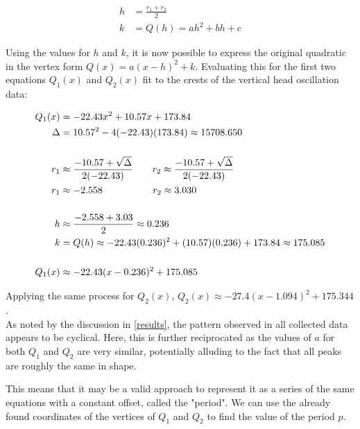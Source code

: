 \documentclass[12pt, a4paper]{article}
\begin{document}
\begin{align*}
    h & = \frac{r_1 + r_2}{2}  \\
    k & = Q(h) = ah^2 + bh + c
\end{align*}

Using the values for $h$ and $k$, it is now possible to express the original
quadratic in the vertex form $Q(x)=a(x-h)^2+k$. Evaluating this for the first
two equations $Q_1(x)$ and $Q_2(x)$ fit to the crests of the vertical head
oscillation data:

\begin{align*}
    Q_1(x) & = -22.43x^2 + 10.57x + 173.84                                                                                                          \\
    \Delta & = 10.57^2 - 4(-22.43)(173.84) \approx 15708.650                                                                                        \\[5mm]
    r_1    & \approx \frac{-10.57 + \sqrt{\Delta}}{2(-22.43)}                         \qquad  r_2  \approx \frac{-10.57 + \sqrt{\Delta}}{2(-22.43)} \\
    r_1    & \approx -2.558                                                           \qquad\qquad\quad\thinspace  r_2  \approx 3.030               \\[5mm]
    h      & \approx \frac{-2.558 + 3.03}{2} \approx 0.236                                                                                          \\
    k      & = Q(h) \approx -22.43(0.236)^2 + (10.57)(0.236) + 173.84 \approx 175.085                                                               \\[5mm]
    Q_1(x) & \approx -22.43(x - 0.236)^2 + 175.085
\end{align*}

Applying the same process for $Q_2(x)$, \quad $Q_2(x) \approx -27.4(x - 1.094)^2 + 175.344$. \\

As noted by the discussion in \ref{results}, the pattern observed in all
collected data appears to be cyclical. Here, this is further reciprocated as the
values of $a$ for both $Q_1$ and $Q_2$ are very similar, potentially alluding to
the fact that all peaks are roughly the same in shape.

This means that it may be a valid approach to represent it as a series of the
same equations with a constant offset, called the "period". We can use the
already found coordinates of the vertices of $Q_1$ and $Q_2$ to find the value
of the period $p$.
\end{document}
